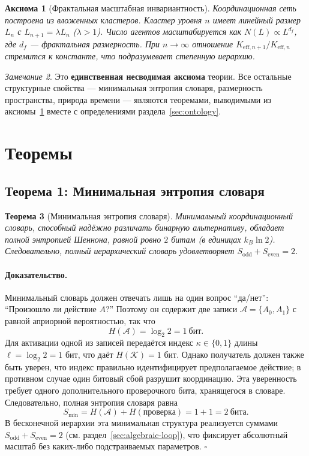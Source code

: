 \documentclass[12pt,a4paper]{article}
\newtheorem{theorem}{Теорема}[section]
\newtheorem{axiom}[theorem]{Аксиома}
\theoremstyle{remark}
\newtheorem{remark}[theorem]{Замечание}
\renewenvironment{proof}{\paragraph{Доказательство.}}{\hfill$\square$}
\begin{document}
	\begin{axiom}[Фрактальная масштабная инвариантность]
		\label{ax:A1}
		Координационная сеть построена из вложенных кластеров. Кластер уровня \(n\) имеет линейный размер \(L_n\) с \(L_{n+1} = \lambda L_n\) (\(\lambda > 1\)). Число агентов масштабируется как \(N(L) \propto L^{d_f}\), где \(d_f\) --- фрактальная размерность. При \(n \to \infty\) отношение \(K_{\mathrm{eff},n+1}/K_{\mathrm{eff},n}\) стремится к константе, что подразумевает степенную иерархию.
	\end{axiom}
	
	\begin{remark}
		Это \textbf{единственная несводимая аксиома} теории. Все остальные структурные свойства --- минимальная энтропия словаря, размерность пространства, природа времени --- являются теоремами, выводимыми из аксиомы~\ref{ax:A1} вместе с определениями раздела~\ref{sec:ontology}.
	\end{remark}
	
	\section{Теоремы}
	\label{sec:theorems}
	
	\subsection{Теорема 1: Минимальная энтропия словаря}
	
	\begin{theorem}[Минимальная энтропия словаря]
		\label{thm:minimal-dict}
		Минимальный координационный словарь, способный надёжно различать бинарную альтернативу, обладает полной энтропией Шеннона, равной ровно \(2\) битам (в единицах \(k_B\ln 2\)). Следовательно, полный иерархический словарь удовлетворяет \(S_{\mathrm{odd}} + S_{\mathrm{even}} = 2\).
	\end{theorem}
	
	\begin{proof}
		Минимальный словарь должен отвечать лишь на один вопрос ``да/нет'': ``Произошло ли действие \(A\)?'' Поэтому он содержит две записи \(\mathcal{A} = \{A_0, A_1\}\) с равной априорной вероятностью, так что
		\[
		H(\mathcal{A}) = \log_2 2 = 1\ \text{бит}.
		\]
		Для активации одной из записей передаётся индекс \(\kappa \in \{0,1\}\) длины \(\ell = \log_2 2 = 1\) бит, что даёт \(H(\mathcal{K}) = 1\) бит. Однако получатель должен также быть уверен, что индекс правильно идентифицирует предполагаемое действие; в противном случае один битовый сбой разрушит координацию. Эта уверенность требует одного дополнительного проверочного бита, хранящегося в словаре. Следовательно, полная энтропия словаря равна
		\[
		S_{\min} = H(\mathcal{A}) + H(\text{проверка}) = 1 + 1 = 2\ \text{бита}.
		\]
		В бесконечной иерархии эта минимальная структура реализуется суммами \(S_{\mathrm{odd}} + S_{\mathrm{even}} = 2\) (см. раздел~\ref{sec:algebraic-loop}), что фиксирует абсолютный масштаб без каких-либо подстраиваемых параметров.
	\end{proof}
	
\end{document}
